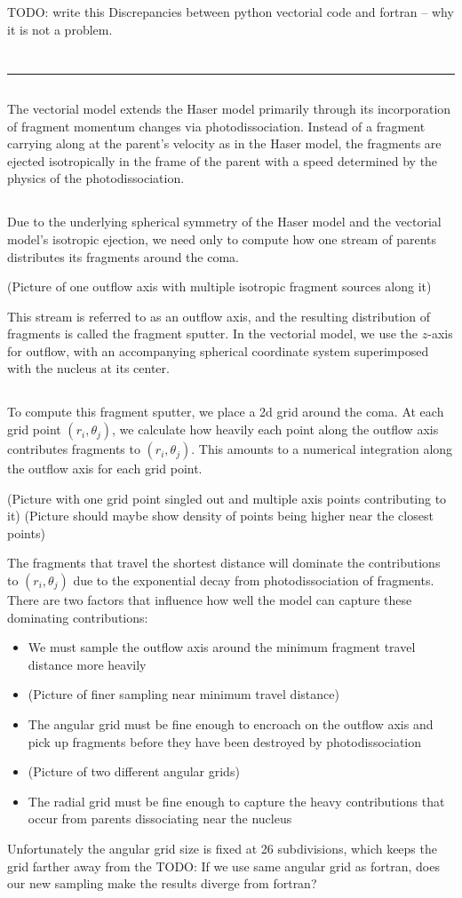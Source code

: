 \documentclass[11pt]{article}
\newcommand{\newproblem}[1]{\section*{\contour{mybblack}{\textcolor{myblack}{#1}}}}
\newcommand{\problempart}[1]{\subsection*{\contour{mybblack}{\textcolor{myblack}{#1}}}}
\begin{document}
\newpage

\newproblem{Problem Statement}
TODO: write this
Discrepancies between python vectorial code and fortran -- why it is not a problem.

\newproblem{Vectorial Model for Haser Enthusiasts}

\hrule
\vspace{5mm}

\problempart{Fragment Sputtering}
The vectorial model extends the Haser model primarily through its incorporation of fragment momentum changes via photodissociation.
Instead of a fragment carrying along at the parent's velocity as in the Haser model, the fragments are ejected isotropically in the frame of the parent with a speed determined by the physics of the photodissociation.

\problempart{Outflow Axis}
Due to the underlying spherical symmetry of the Haser model and the vectorial model's isotropic ejection, we need only to compute how one stream of parents distributes its fragments around the coma.

(Picture of one outflow axis with multiple isotropic fragment sources along it)

This stream is referred to as an outflow axis, and the resulting distribution of fragments is called the fragment sputter.
In the vectorial model, we use the \(z\)-axis for outflow, with an accompanying spherical coordinate system superimposed with the nucleus at its center.

\problempart{Fragment Sputter}
To compute this fragment sputter, we place a 2d grid around the coma.
At each grid point \((r_i, \theta_j)\), we calculate how heavily each point along the outflow axis contributes fragments to \((r_i, \theta_j)\).
This amounts to a numerical integration along the outflow axis for each grid point.

(Picture with one grid point singled out and multiple axis points contributing to it)
(Picture should maybe show density of points being higher near the closest points)

The fragments that travel the shortest distance will dominate the contributions to \((r_i, \theta_j)\) due to the exponential decay from photodissociation of fragments.
There are two factors that influence how well the model can capture these dominating contributions:
\begin{itemize}
  \item We must sample the outflow axis around the minimum fragment travel distance more heavily
  \item (Picture of finer sampling near minimum travel distance)
  \item The angular grid must be fine enough to encroach on the outflow axis and pick up fragments before they have been destroyed by photodissociation
  \item (Picture of two different angular grids)
  \item The radial grid must be fine enough to capture the heavy contributions that occur from parents dissociating near the nucleus
\end{itemize}

Unfortunately the angular grid size is fixed at 26 subdivisions, which keeps the grid farther away from the
TODO: If we use same angular grid as fortran, does our new sampling make the results diverge from fortran?
\end{document}
